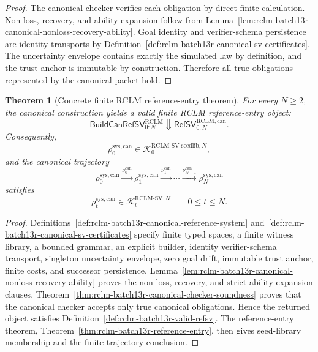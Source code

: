 \documentclass[11pt,a4paper]{article}
\newtheorem{theorem}{Theorem}[section]
\newcommand{\Kcal}{\mathcal K}
\newcommand{\RCLM}{\mathrm{RCLM}}
\newcommand{\sys}{\mathrm{sys}}
\begin{document}
\begin{proof}
The canonical checker verifies each obligation by direct finite calculation.  Non-loss, recovery, and ability expansion follow from Lemma~\ref{lem:rclm-batch13r-canonical-nonloss-recovery-ability}.  Goal identity and verifier-schema persistence are identity transports by Definition~\ref{def:rclm-batch13r-canonical-sv-certificates}.  The uncertainty envelope contains exactly the simulated law by definition, and the trust anchor is immutable by construction.  Therefore all true obligations represented by the canonical packet hold.
\end{proof}

\begin{theorem}[Concrete finite RCLM reference-entry theorem]
\label{thm:rclm-batch13r-concrete-canonical-reference-entry}
For every \(N\ge2\), the canonical construction yields a valid finite RCLM reference-entry object:
\[
\boxed{
\mathsf{BuildCanRefSV}_{0:N}^{\RCLM}
\Downarrow
\mathsf{RefSV}_{0:N}^{\RCLM,\mathrm{can}}.
}
\]
Consequently,
\[
\rho_0^{\sys,\mathrm{can}}
\in
\Kcal_0^{\RCLM\text{-}\mathrm{SV\mbox{-}seedlib},N},
\]
and the canonical trajectory
\[
\rho_0^{\sys,\mathrm{can}}
\xrightarrow{\nu_0^{\mathrm{can}}}
\rho_1^{\sys,\mathrm{can}}
\xrightarrow{\nu_1^{\mathrm{can}}}
\cdots
\xrightarrow{\nu_{N-1}^{\mathrm{can}}}
\rho_N^{\sys,\mathrm{can}}
\]
satisfies
\[
\rho_t^{\sys,\mathrm{can}}
\in
\Kcal_t^{\RCLM\text{-}\mathrm{SV},N}
\qquad
0\le t\le N.
\]
\end{theorem}

\begin{proof}
Definitions~\ref{def:rclm-batch13r-canonical-reference-system} and~\ref{def:rclm-batch13r-canonical-sv-certificates} specify finite typed spaces, a finite witness library, a bounded grammar, an explicit builder, identity verifier-schema transport, singleton uncertainty envelope, zero goal drift, immutable trust anchor, finite costs, and successor persistence.  Lemma~\ref{lem:rclm-batch13r-canonical-nonloss-recovery-ability} proves the non-loss, recovery, and strict ability-expansion clauses.  Theorem~\ref{thm:rclm-batch13r-canonical-checker-soundness} proves that the canonical checker accepts only true canonical obligations.  Hence the returned object satisfies Definition~\ref{def:rclm-batch13r-valid-refsv}.  The reference-entry theorem, Theorem~\ref{thm:rclm-batch13r-reference-entry}, then gives seed-library membership and the finite trajectory conclusion.
\end{proof}
\end{document}
